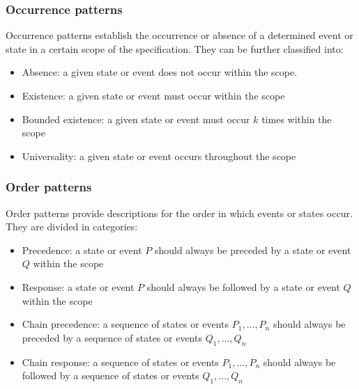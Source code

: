 \subsubsection{Occurrence patterns}

Occurrence patterns establish the occurrence or absence of a determined event or state in a certain scope of the specification. They can be further classified into:

\begin{itemize}

\item Absence: a given state or event does not occur within the scope.

\item Existence: a given state or event must occur within the scope

\item Bounded existence: a given state or event must occur $k$ times within the scope

\item Universality: a given state or event occurs throughout the scope

\end{itemize}

\subsubsection{Order patterns}

Order patterns provide descriptions for the order in which events or states occur. They are divided in categories:

\begin{itemize}
\item Precedence: a state or event $P$ should always be preceded by a state or event $Q$ within the scope

\item Response: a state or event $P$ should always be followed by a state or event $Q$ within the scope

\item Chain precedence: a sequence of states or events $P_1,...,P_n$ should always be preceded by a sequence of states or events $Q_1,...,Q_n$

\item Chain response: a sequence of states or events $P_1,...,P_n$ should always be followed by a sequence of states or events $Q_1,...,Q_n$
\end{itemize}


